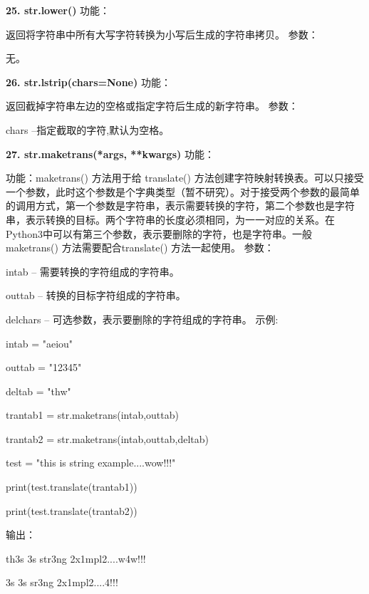 \documentclass{book}
\begin{document}
\begin{CJK}{UTF8}{gbsn}
\noindent \textbf{25. str.lower()} \newline
功能：\par 返回将字符串中所有大写字符转换为小写后生成的字符串拷贝。\newline
参数：\par 无。
\newline

\noindent \textbf{26. str.lstrip(chars=None)} \newline
功能：\par 返回截掉字符串左边的空格或指定字符后生成的新字符串。\newline
参数：\par chars --指定截取的字符,默认为空格。
\newline

\noindent \textbf{27. str.maketrans(*args, **kwargs)} \newline
功能：\par   功能：maketrans() 方法用于给 translate() 方法创建字符映射转换表。可以只接受一个参数，此时这个参数是个字典类型（暂不研究）。对于接受两个参数的最简单的调用方式，第一个参数是字符串，表示需要转换的字符，第二个参数也是字符串，表示转换的目标。两个字符串的长度必须相同，为一一对应的关系。在Python3中可以有第三个参数，表示要删除的字符，也是字符串。一般 maketrans() 方法需要配合translate() 方法一起使用。\newline
参数：\par intab -- 需要转换的字符组成的字符串。
     \par outtab -- 转换的目标字符组成的字符串。
     \par delchars -- 可选参数，表示要删除的字符组成的字符串。\newline
示例: \par intab = "aeiou"
     \par outtab = "12345"
     \par deltab = "thw"
 	 \par trantab1 = str.maketrans(intab,outtab)  
	 \par trantab2 = str.maketrans(intab,outtab,deltab)  
	 \par test = "this is string example....wow!!!"
	 \par print(test.translate(trantab1))
	 \par print(test.translate(trantab2))
     \par 输出：
     \par th3s 3s str3ng 2x1mpl2....w4w!!!
	 \par 3s 3s sr3ng 2x1mpl2....4!!!
\newline


\end{CJK}
\end{document}
